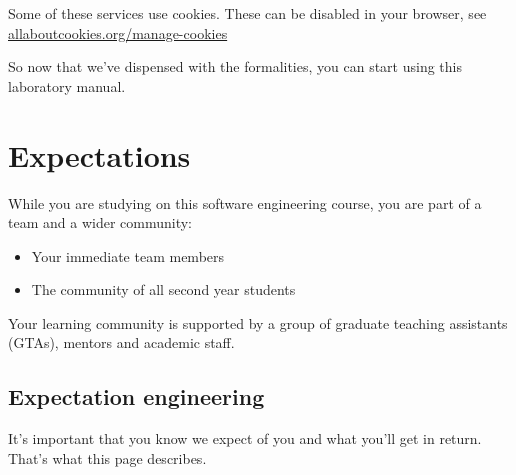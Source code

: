 \documentclass[
]{book}
\providecommand{\tightlist}{%
  \setlength{\itemsep}{0pt}\setlength{\parskip}{0pt}}
\begin{document}
Some of these services use cookies. These can be disabled in your browser, see \href{https://www.allaboutcookies.org/manage-cookies/}{allaboutcookies.org/manage-cookies}

So now that we've dispensed with the formalities, you can start using this laboratory manual.























\hypertarget{expectations}{%
\chapter*{Expectations}\label{expectations}}

While you are studying on this software engineering course, you are part of a team and a wider community:

\begin{itemize}
\tightlist
\item
  Your immediate team members
\item
  The community of all second year students
\end{itemize}

Your learning community is supported by a group of graduate teaching assistants (GTAs), mentors and academic staff.

\hypertarget{agile}{%
\section{Expectation engineering}\label{agile}}

It's important that you know we expect of you and what you'll get in return. That's what this page describes.
\end{document}
